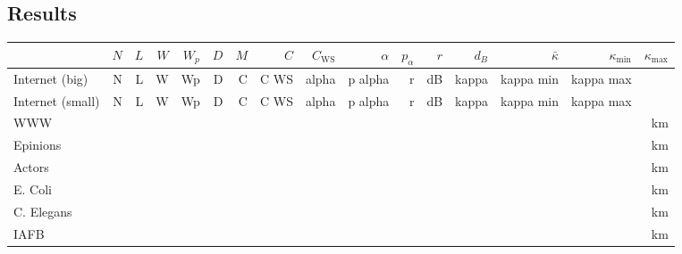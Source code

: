 \documentclass{article}
\theoremstyle{definition}
\begin{document}
\begin{landscape}

\section*{Results}

\begin{tabular}{l | r r r r r r r r r r r r r r r }
  \hline
    & $N$ & $L$ & $W$ & $W_p$ & $D$ & $M$ & $C$ & $C_{\mbox{WS}}$ & $\alpha$ & $p_\alpha$ & $r$ & $d_B$ & $\bar{\kappa}$ & $\kappa_{\mbox{min}}$ & $\kappa_{\mbox{max}}$  \\
    \hline
 Internet (big) & N & L & W & Wp & D & C & C WS & alpha & p alpha & r & dB & kappa & kappa min & kappa max \\
 Internet (small) & N & L &  W & Wp & D & C & C WS & alpha & p alpha & r & dB & kappa & kappa min & kappa max \\    
 WWW & & & & & & & & & & & & & & & km \\
 Epinions & & & & & & & & & & & & & & & km \\ 
 Actors  & & & & & & & & & & & & & & & km \\
 E. Coli  & & & & & & & & & & & & & & & km \\
 C. Elegans  & & & & & & & & & & & & & & & km \\
 IAFB  & & & & & & & & & & & & & & & km \\ 
 \hline

\end{tabular}

\end{landscape}



\end{document}
